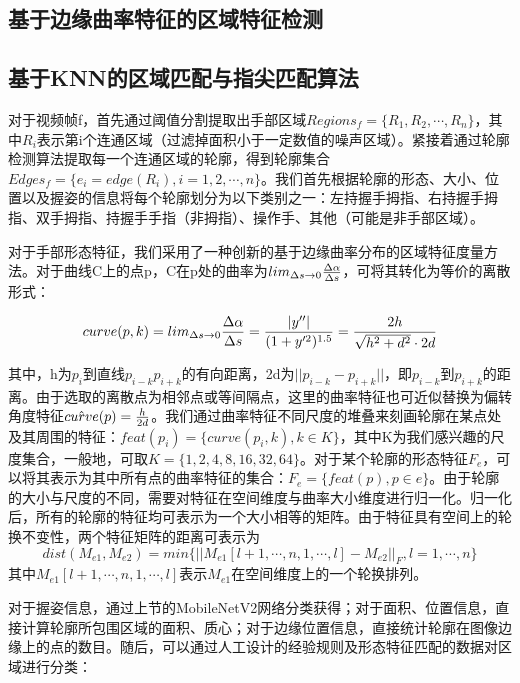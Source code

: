 \subsection{基于边缘曲率特征的区域特征检测}

\subsection{基于KNN的区域匹配与指尖匹配算法}

对于视频帧f，首先通过阈值分割提取出手部区域$Regions_f=\{R_1, R_2, \cdots, R_n\}$，其中$R_i$表示第i个连通区域（过滤掉面积小于一定数值的噪声区域）。紧接着通过轮廓检测算法提取每一个连通区域的轮廓，得到轮廓集合$Edges_f = \{e_i = edge(R_i), i=1,2,\cdots,n\}$。我们首先根据轮廓的形态、大小、位置以及握姿的信息将每个轮廓划分为以下类别之一：左持握手拇指、右持握手拇指、双手拇指、持握手手指（非拇指）、操作手、其他（可能是非手部区域）。

对于手部形态特征，我们采用了一种创新的基于边缘曲率分布的区域特征度量方法。对于曲线C上的点p，C在p处的曲率为$lim_{\Delta s \to 0} {{\Delta \alpha}\over{\Delta s}}$，可将其转化为等价的离散形式：

\begin{equation}
    curve(p,k)=lim_{\Delta s \to 0} {{\Delta \alpha}\over{\Delta s}} = {|y''| \over {(1+y'^2)^{1.5}}} = {2h \over{\sqrt{h^2+d^2}\cdot 2d}}
\end{equation}

其中，h为$p_i$到直线$p_{i-k}p_{i+k}$的有向距离，2d为$||p_{i-k}-p_{i+k}||$，即$p_{i-k}$到$p_{i+k}$的距离。由于选取的离散点为相邻点或等间隔点，这里的曲率特征也可近似替换为偏转角度特征$\hat{curve}(p)={h \over 2d}$。我们通过曲率特征不同尺度的堆叠来刻画轮廓在某点处及其周围的特征：$feat(p_i) = \{curve(p_i,k), k \in K\}$，其中K为我们感兴趣的尺度集合，一般地，可取$K=\{1, 2, 4, 8, 16, 32, 64\}$。对于某个轮廓的形态特征$F_e$，可以将其表示为其中所有点的曲率特征的集合：$F_e = \{feat(p), p \in e\}$。由于轮廓的大小与尺度的不同，需要对特征在空间维度与曲率大小维度进行归一化。归一化后，所有的轮廓的特征均可表示为一个大小相等的矩阵。由于特征具有空间上的轮换不变性，两个特征矩阵的距离可表示为
\begin{equation}
    dist(M_{e1}, M_{e2}) = min\{||M_{e1}[l+1,\cdots,n,1,\cdots,l]-M_{e2}||_F, l = 1,\cdots,n\}
\end{equation}
其中$M_{e1}[l+1,\cdots,n,1,\cdots,l]$表示$M_{e1}$在空间维度上的一个轮换排列。

对于握姿信息，通过上节的MobileNetV2网络分类获得；对于面积、位置信息，直接计算轮廓所包围区域的面积、质心；对于边缘位置信息，直接统计轮廓在图像边缘上的点的数目。随后，可以通过人工设计的经验规则及形态特征匹配的数据对区域进行分类：

